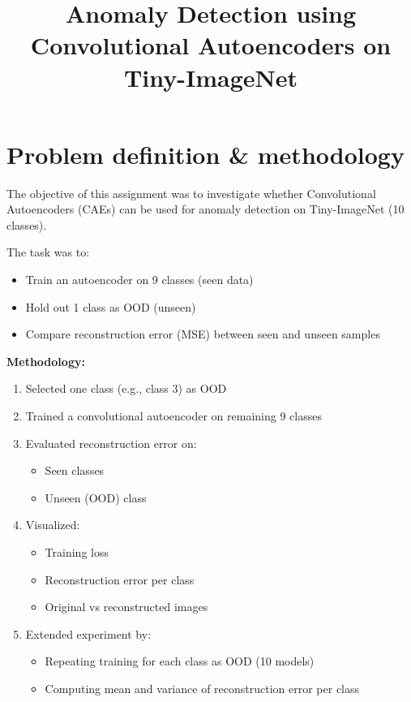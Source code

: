 \documentclass[12pt,a4paper]{article}
\title{Anomaly Detection using Convolutional Autoencoders on Tiny-ImageNet}
\author{}
\date{}
\begin{document}
\maketitle

\section{Problem definition \& methodology}

The objective of this assignment was to investigate whether Convolutional Autoencoders (CAEs) can be used for anomaly detection on Tiny-ImageNet (10 classes). 

The task was to:
\begin{itemize}
    \item Train an autoencoder on 9 classes (seen data)
    \item Hold out 1 class as OOD (unseen)
    \item Compare reconstruction error (MSE) between seen and unseen samples
\end{itemize}

\textbf{Methodology:}
\begin{enumerate}
    \item Selected one class (e.g., class 3) as OOD
    \item Trained a convolutional autoencoder on remaining 9 classes
    \item Evaluated reconstruction error on:
    \begin{itemize}
        \item Seen classes
        \item Unseen (OOD) class
    \end{itemize}
    \item Visualized:
    \begin{itemize}
        \item Training loss
        \item Reconstruction error per class
        \item Original vs reconstructed images
    \end{itemize}
    \item Extended experiment by:
    \begin{itemize}
        \item Repeating training for each class as OOD (10 models)
        \item Computing mean and variance of reconstruction error per class
    \end{itemize}
\end{enumerate}
\end{document}
